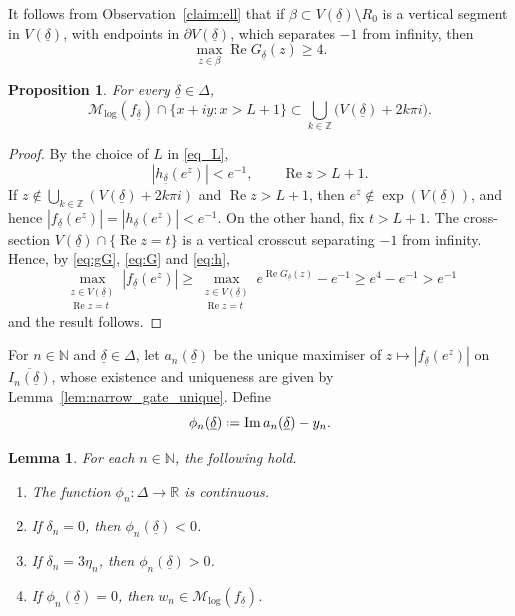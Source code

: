 \documentclass[a4paper, 11pt, reqno]{amsart}
\numberwithin{equation}{section}
\theoremstyle{plain}
\newtheorem{proposition}[theorem]{Proposition}
\newtheorem{lemma}[theorem]{Lemma}
\newcommand*{\defeq}{\mathrel{\vcenter{\baselineskip0.5ex \lineskiplimit0pt
 \hbox{\scriptsize.}\hbox{\scriptsize.}}}=}
\theoremstyle{remark}
\newcommand{\R}{{\mathbb{R}}}
\newcommand{\Z}{{\mathbb{Z}}}
\newcommand{\N}{{\mathbb{N}}}
\newcommand{\Mlog}{{\mathcal{M}_{\log}}}
\newcommand{\uldelta}{\underline{\delta}}
\newcommand{\Rea}{\operatorname{Re }}
\newcommand{\Ima}{\operatorname{Im }}
\begin{document}
It follows from Observation~\ref{claim:ell} that if \(\beta\subset V(\uldelta)\setminus R_0\) is a vertical segment in \(V(\uldelta)\), with endpoints in \(\partial V(\uldelta)\), which separates \(-1\) from infinity, then
\begin{equation}\label{eq:G}
	\max_{z\in\beta}\Rea G_{\uldelta}(z)\ge4.
\end{equation}

\begin{proposition}\label{prop_MaxInV}
	For every \(\uldelta\in\Delta\),
	\[
	\Mlog(f_{\uldelta})\cap\{x+iy:x>L+1\}
	\subset \bigcup_{k\in\Z}\bigl(V(\uldelta)+2k\pi i\bigr).
	\]
\end{proposition}

\begin{proof}
	By the choice of \(L\) in \eqref{eq_L},
	\begin{equation}\label{eq:h}
		|h_{\uldelta}(e^z)|<e^{-1},\qquad \Rea z>L+1.
	\end{equation}
	If \(z\notin\bigcup_{k\in\Z}(V(\uldelta)+2k\pi i)\) and \(\Rea z>L+1\), then \(e^z\notin\exp(V(\uldelta))\), and hence \(|f_{\uldelta}(e^z)|=|h_{\uldelta}(e^z)|<e^{-1}\). On the other hand, fix \(t>L+1\). The cross-section \(V(\uldelta)\cap\{\Rea z=t\}\) is a vertical crosscut separating \(-1\) from infinity. Hence, by \eqref{eq:gG}, \eqref{eq:G} and \eqref{eq:h},
	\[
	\max_{\substack{z\in V(\uldelta)\\ \Rea z=t}} |f_{\uldelta}(e^z)|
	\ge
	\max_{\substack{z\in V(\uldelta)\\ \Rea z=t}} e^{\Rea G_{\uldelta}(z)}-e^{-1}
	\ge e^4-e^{-1}>e^{-1}
	\]
	and the result follows.
\end{proof}


For \(n\in\N\) and \(\uldelta\in\Delta\), let \(a_n(\uldelta)\) be the unique maximiser of \(z\mapsto |f_{\uldelta}(e^z)|\) on \(\overline{I_n(\uldelta)}\), whose existence and uniqueness are given by Lemma~\ref{lem:narrow_gate_unique}. Define
\begin{equation}\label{eq:phi_n}
	\phi_n(\uldelta)\defeq \Ima a_n(\uldelta)-y_n.
\end{equation}

\begin{lemma}\label{lem_props}
	For each \(n\in\N\), the following hold.
	\begin{enumerate}
		\item The function \(\phi_n:\Delta\to\R\) is continuous.
		\item If \(\delta_n=0\), then \(\phi_n(\uldelta)<0\). \label{lem_props:2}
		\item If \(\delta_n=3\eta_n\), then \(\phi_n(\uldelta)>0\). \label{lem_props:3}
		\item If \(\phi_n(\uldelta)=0\), then \(w_n\in\Mlog(f_{\uldelta})\).
	\end{enumerate}
\end{lemma}
\end{document}

